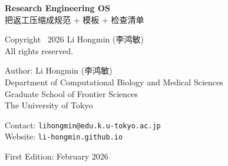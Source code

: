 \thispagestyle{empty}
\vspace*{2in}

\noindent
\textbf{Research Engineering OS}\\
把返工压缩成规范 + 模板 + 检查清单

\vspace{0.5\baselineskip}

\noindent
Copyright \textcopyright\ 2026 Li Hongmin (李鸿敏)\\
All rights reserved.

\vspace{0.5\baselineskip}

\noindent
Author: Li Hongmin (李鸿敏)\\
Department of Computational Biology and Medical Sciences\\
Graduate School of Frontier Sciences\\
The University of Tokyo

\vspace{0.5\baselineskip}

\noindent
Contact: \texttt{lihongmin@edu.k.u-tokyo.ac.jp}\\
Website: \texttt{li-hongmin.github.io}

\vspace{\baselineskip}

\noindent
First Edition: February 2026

\clearpage
